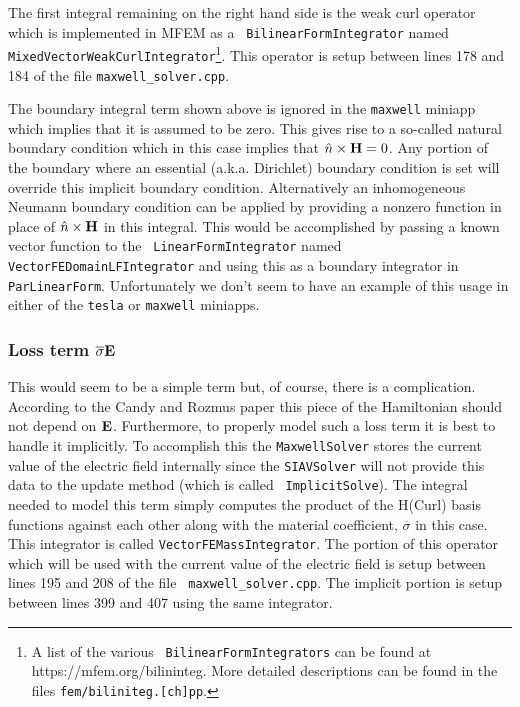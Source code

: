 \documentclass[12pt]{article}
\providecommand{\E}{\mbox{\bf E}}
\renewcommand{\H}{\mbox{\bf H}}
\providecommand{\sE}{\overline{\sigma}}
\begin{document}
The first integral remaining on the right hand side is the weak curl
operator which is implemented in MFEM as a {\tt
  BilinearFormIntegrator} named {\tt
  MixedVectorWeakCurlIntegrator}\footnote{A list of the various {\tt
    BilinearFormIntegrators} can be found at
  https://mfem.org/bilininteg. More detailed descriptions can be found
  in the files {\tt fem/biliniteg.[ch]pp}.}. This operator is
setup between lines 178 and 184 of the file {\tt maxwell\_solver.cpp}.

The boundary integral term shown above is ignored in the {\tt maxwell}
miniapp which implies that it is assumed to be zero. This gives rise
to a so-called natural boundary condition which in this case implies
that $\hat{n}\times\H=0$. Any portion of the boundary where an
essential (a.k.a. Dirichlet) boundary condition is set will override
this implicit boundary condition. Alternatively an inhomogeneous
Neumann boundary condition can be applied by providing a nonzero
function in place of $\hat{n}\times\H$ in this integral. This would be
accomplished by passing a known vector function to the {\tt
  LinearFormIntegrator} named {\tt VectorFEDomainLFIntegrator} and
using this as a boundary integrator in {\tt
  ParLinearForm}. Unfortunately we don't seem to have an example of
this usage in either of the {\tt tesla} or {\tt maxwell} miniapps.

\subsubsection{Loss term $\sE\E$}

This would seem to be a simple term but, of course, there is a
complication. According to the Candy and Rozmus paper this piece of
the Hamiltonian should not depend on $\E$. Furthermore, to properly
model such a loss term it is best to handle it implicitly. To
accomplish this the {\tt MaxwellSolver} stores the current value of
the electric field internally since the {\tt SIAVSolver} will not
provide this data to the update method (which is called {\tt
  ImplicitSolve}). The integral needed to model this term simply
computes the product of the H(Curl) basis functions against each other
along with the material coefficient, $\sE$ in this case. This
integrator is called {\tt VectorFEMassIntegrator}. The portion of this
operator which will be used with the current value of the electric
field is setup between lines 195 and 208 of the file {\tt
  maxwell\_solver.cpp}. The implicit portion is setup between lines
399 and 407 using the same integrator.
\end{document}

